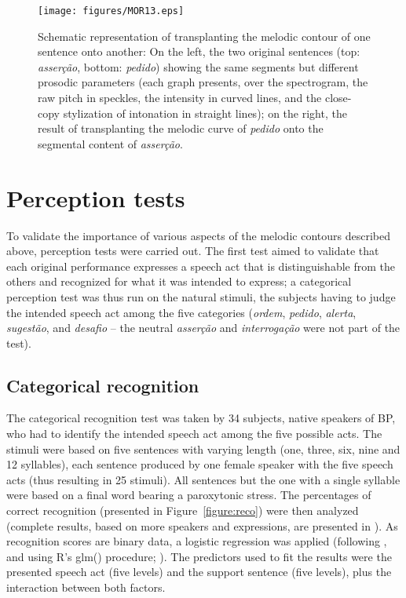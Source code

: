\documentclass[output=paper]{LSP/langsci}
\begin{document}
\begin{figure}

\texttt{[image: figures/MOR13.eps]}
\caption{Schematic representation of transplanting the melodic contour of one sentence onto another: On the left, the two original sentences (top: \textit{asserção}, bottom: \textit{pedido}) showing the same segments but different prosodic parameters (each graph presents, over the spectrogram, the raw pitch in speckles, the intensity in curved lines, and the close-copy stylization of intonation in straight lines); on the right, the result of transplanting the melodic curve of \textit{pedido} onto the segmental content of \textit{asserção}.}
\label{figure:Transplantation}
\end{figure}


\section{Perception tests}
\label{perception}

To validate the importance of various aspects of the melodic contours described above, perception tests were carried out. 
The first test aimed to validate that each original performance expresses a speech act that is distinguishable from the others and recognized for what it was intended to express; a categorical perception test was thus run on the natural stimuli, the subjects having to judge the intended speech act among the five categories (\textit{ordem}, \textit{pedido}, \textit{alerta}, \textit{sugestão}, and \textit{desafio} -- the neutral \textit{asserção} and \textit{interrogação} were not part of the test).


\subsection{Categorical recognition}
\label{perception:categorical}

The categorical recognition test was taken by 34 subjects, native speakers of BP, who had to identify the intended speech act among the five possible acts. 
The stimuli were based on five sentences with varying length (one, three, six, nine and 12 syllables), each sentence produced by one female speaker with the five speech acts (thus resulting in 25 stimuli). 
All sentences but the one with a single syllable were based on a final word bearing a paroxytonic stress. 
The percentages of correct recognition (presented in Figure~\ref{figure:reco}) were then analyzed (complete results, based on more speakers and expressions, are presented in \citealt{moraes2014}). 
As recognition scores are binary data, a logistic regression was applied (following \citealt[][196]{baayen2008analyzing}, and using R's glm() procedure; \citealt{Rtool}). 
The predictors used to fit the results were the presented speech act (five levels) and the support sentence (five levels), plus the interaction between both factors.
\end{document}
